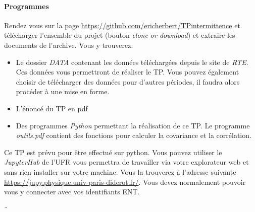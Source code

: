 \documentclass[12pt,a4,french]{article}
\newcommand{\tmtextit}[1]{{\itshape{#1}}}
\begin{document}
\paragraph{Programmes}
Rendez vous sur la page \href{https://github.com/ericherbert/TPintermittence}{https://github.com/ericherbert/TPintermittence} et télécharger l'ensemble du projet (bouton \tmtextit{clone or download}) et extraire les
documents de l'archive. Vous y trouverez:
\begin{itemize}
  \item Le dossier \tmtextit{DATA} contenant les données téléchargées depuis le site de \tmtextit{RTE}. Ces données vous permettront de réaliser le TP. Vous pouvez également choisir de télécharger des données pour d'autres périodes, il faudra alors procéder à une mise en forme.
  
  \item L'énoncé du TP en pdf
  
  \item Des programmes \tmtextit{Python} permettant la réalisation de ce TP. Le programme \textit{outils.pdf} contient des fonctions pour calculer la covariance et la corrélation.
\end{itemize}
Ce TP est prévu pour être effectué sur python. Vous pouvez utiliser le \tmtextit{JupyterHub} de l'UFR vous permettra de travailler via votre explorateur web et sans rien installer sur votre machine. Vous la trouverez à l'adresse suivante
\href{https://jupy.physique.univ-paris-diderot.fr/}{https://jupy.physique.univ-paris-diderot.fr/}. Vous devez normalement pouvoir vous y connecter avec vos identifiants ENT.



¨
%  
%  
%  
%  
\end{document}
